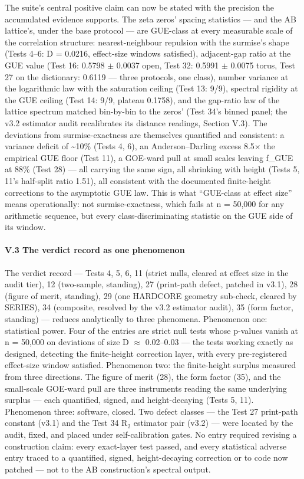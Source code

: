 \documentclass[10pt]{article}
\begin{document}
The suite's central positive claim can now be stated with the precision the accumulated evidence supports. The zeta zeros' spacing statistics --- and the AB lattice's, under the base protocol --- are GUE-class at every measurable scale of the correlation structure: nearest-neighbour repulsion with the surmise's shape (Tests 4--6: D = 0.0216, effect-size windows satisfied), adjacent-gap ratio at the GUE value (Test 16: 0.5798 $\pm$ 0.0037 open, Test 32: 0.5991 $\pm$ 0.0075 torus, Test 27 on the dictionary: 0.6119 --- three protocols, one class), number variance at the logarithmic law with the saturation ceiling (Test 13: 9/9), spectral rigidity at the GUE ceiling (Test 14: 9/9, plateau 0.1758), and the gap-ratio law of the lattice spectrum matched bin-by-bin to the zeros' (Test 34's binned panel; the v3.2 estimator audit recalibrates its distance readings, Section V.3). The deviations from surmise-exactness are themselves quantified and consistent: a variance deficit of \textasciitilde{}10\% (Tests 4, 6), an Anderson--Darling excess 8.5$\times$ the empirical GUE floor (Test 11), a GOE-ward pull at small scales leaving f\_GUE at 88\% (Test 28) --- all carrying the same sign, all shrinking with height (Tests 5, 11's half-split ratio 1.51), all consistent with the documented finite-height corrections to the asymptotic GUE law. This is what ``GUE-class at effect size'' means operationally: not surmise-exactness, which fails at n = 50,000 for any arithmetic sequence, but every class-discriminating statistic on the GUE side of its window.

\paragraph{V.3 The verdict record as one phenomenon}

The verdict record --- Tests 4, 5, 6, 11 (strict nulls, cleared at effect size in the audit tier), 12 (two-sample, standing), 27 (print-path defect, patched in v3.1), 28 (figure of merit, standing), 29 (one HARDCORE geometry sub-check, cleared by SERIES), 34 (composite, resolved by the v3.2 estimator audit), 35 (form factor, standing) --- reduces analytically to three phenomena. Phenomenon one: statistical power. Four of the entries are strict null tests whose p-values vanish at n = 50,000 on deviations of size D $\approx$ 0.02--0.03 --- the tests working exactly as designed, detecting the finite-height correction layer, with every pre-registered effect-size window satisfied. Phenomenon two: the finite-height surplus measured from three directions. The figure of merit (28), the form factor (35), and the small-scale GOE-ward pull are three instruments reading the same underlying surplus --- each quantified, signed, and height-decaying (Tests 5, 11). Phenomenon three: software, closed. Two defect classes --- the Test 27 print-path constant (v3.1) and the Test 34 R$_2$ estimator pair (v3.2) --- were located by the audit, fixed, and placed under self-calibration gates. No entry required revising a construction claim: every exact-layer test passed, and every statistical adverse entry traced to a quantified, signed, height-decaying correction or to code now patched --- not to the AB construction's spectral output.
\end{document}
